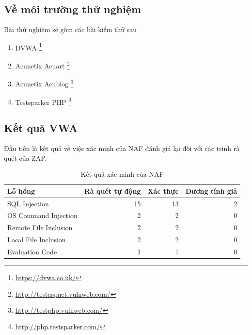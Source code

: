 \documentclass[./../main.tex]{subfiles}
\begin{document}
\subsection{Về môi trường thử nghiệm}

Bài thử nghiệm sẽ gồm các bài kiểm thử sau
\begin{enumerate}
	\item DVWA \footnote{\url{https://dvwa.co.uk/}}
	\item Acunetix Acuart \footnote{\url{http://testaspnet.vulnweb.com/}}
	\item Acunetix Acublog \footnote{\url{http://testphp.vulnweb.com/}}
	\item Testsparker PHP \footnote{\url{http://php.testsparker.com/}}
\end{enumerate}

\subsection{Kết quả VWA}

Đầu tiên là kết quả về việc xác minh của NAF đánh giá lại đối với các trình rà quét của ZAP.

\begin{table}[ht!]
	\begin{tabular}{|l|r|r|r|}
		\hline
		\textbf{Lỗ hổng}      & \multicolumn{1}{l|}{\textbf{Rà quét tự động}} & \multicolumn{1}{l|}{\textbf{Xác thực}} & \multicolumn{1}{l|}{\textbf{Dương tính giả}} \\ \hline
		SQL Injection         & 15                                            & 13                                     & 2                                            \\ \hline
		OS Command Injection  & 2                                             & 2                                      & 0                                            \\ \hline
		Remote File Inclusion & 2                                             & 2                                      & 0                                            \\ \hline
		Local File Inclusion  & 2                                             & 2                                      & 0                                            \\ \hline
		Evaluation Code       & 1                                             & 1                                      & 0                                            \\ \hline
	\end{tabular}
	\caption{Kết quả xác minh của NAF}
\end{table}
\end{document}
